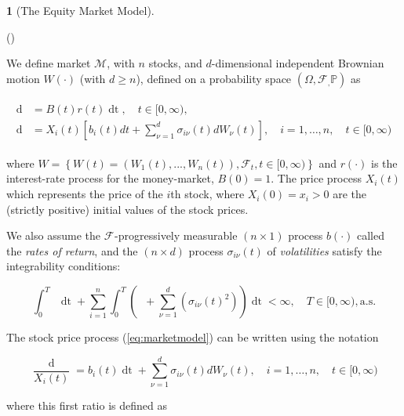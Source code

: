 \documentclass[british]{amsart}
\numberwithin{equation}{section}
\numberwithin{figure}{section}
\theoremstyle{plain}
\theoremstyle{definition}
\newtheorem{defn}[thm]{\protect\definitionname}
\theoremstyle{plain}
\theoremstyle{plain}
\theoremstyle{plain}
\theoremstyle{remark}
\theoremstyle{plain}
\providecommand{\definitionname}{Definition}
\renewcommand{\d}[1]{\mathop{\mathrm{d}{#1}}}
\newcommand{\ranget}{t\in[0,\infty)}
\newcommand{\filtration}[1]{\mathcal{F}_{#1}}
\newcommand{\almostsurely}{\text{a.s.}}
\newcommand{\abs}[1]{\mathop{|{#1}|}}
\newcommand{\market}{\mathcal{M}}
\newcommand{\rangei}{i=1,\dots,n}
\newcommand{\measure}{\mathbb{P}}
\newcommand{\probabilityspace}{(\Omega,\filtration,\measure)}
\begin{document}
\begin{defn} [The Equity Market Model]
  \label{def:marketmodel}

  (\cite{fernholz2009})

  We define market $\market$, with $n$ stocks, and $d$-dimensional independent Brownian 
  motion $W(\cdot)$ (with $d \ge n$), defined on a probability space 
  $\probabilityspace$ as

  \begin{gather}
    \label{eq:marketmodel}
    \begin{split}
      \d{B(t)} &= B(t)r(t)\d{t},  
        \quad \ranget, \\
      \d{X_{i}(t)} &= X_{i}(t) \left[b_{i}(t)dt + \sum_{\nu=1}^{d} \sigma_{i\nu}(t) dW_{\nu}(t)\right],
        \quad \rangei,
        \quad \ranget
    \end{split}
  \end{gather}

  where $W = \left\{ W(t)=(W_{1}(t),...,W_{n}(t)),\filtration{t},\ranget \right\}$ and $r(\cdot)$ is the interest-rate process for the money-market, $B(0)=1$. The price process $X_{i}(t)$ which represents the price of the $i$th stock, where $X_{i}(0) = x_{i} > 0$ are the (strictly positive) initial values of the stock prices.

  We also assume the $\filtration{}$-progressively measurable $(n \times 1)$ process $b(\cdot)$ called the \textit{rates of return}, and the $(n \times d)$ process $\sigma_{i\nu}(t)$ of \textit{volatilities} satisfy the integrability conditions: 

  \begin{equation*}
    \int_{0}^{T} 
    \abs{r(t)} 
    \d{t} +
    \sum_{i=1}^{n} \int_{0}^{T} 
      \left( 
          \abs{b_{i}(t)} +
          \sum_{\nu=1}^{d} ( \sigma_{i\nu}(t)^2  ) 
          \right) \d{t} < \infty,
    \quad
    T \in [0, \infty),
    \almostsurely
   \end{equation*}

\end{defn}

The stock price process (\ref{eq:marketmodel}) can be written using the notation 

\begin{equation}
  \label{eq:stockpriceprocessdiff}
    \frac{\d{X_{i}(t)}}{X_{i}(t)} = b_{i}(t)\d{t} + \sum_{\nu=1}^{d}
\sigma_{i\nu}(t) dW_{\nu}(t), \quad \rangei, \quad \ranget \end{equation}

where this first ratio is defined as
\end{document}
